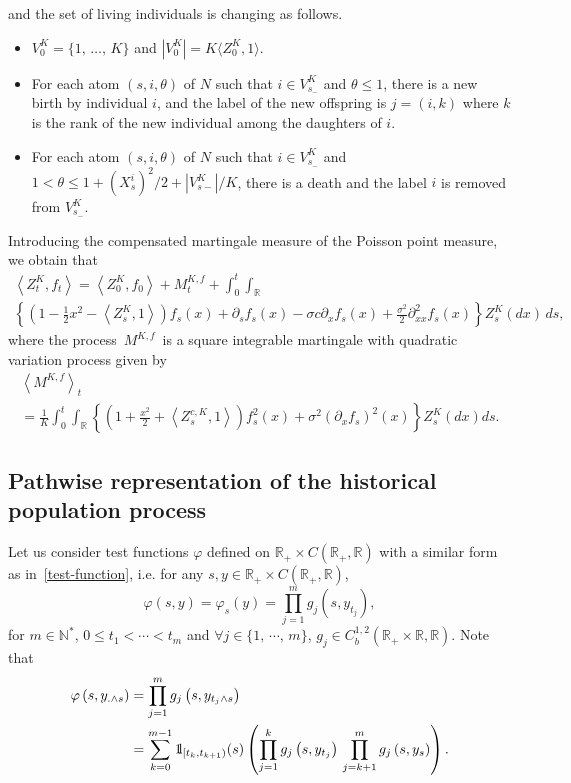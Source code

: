 \documentclass[10pt]{amsart}
\theoremstyle{definition}\newtheorem{defi}[theo]{Definition}\newtheorem{rema}[theo]{Remark}\newtheorem{exam}[theo]{Example}\newtheorem{exem}[theo]{Example}\newtheorem{nota}[theo]{Notation}
\newcommand*\N{\mathbb{N}}
\newcommand*\R{\mathbb{R}}
\newcommand*\ind{{\mathchoice {\rm 1\mskip-4mu l} {\rm 1\mskip-4mu l} {\rm 1\mskip-4.5mu l} {\rm 1\mskip-5mu l}}}
\let\oldforall\forall
\renewcommand*{\forall}{\mathrel{\oldforall}}
\begin{document}
and the set of living individuals is changing as follows.
\begin{itemize}
\item $V^K_0=\{1,\,\ldots,\,K\}$ and $|V^K_0|=K\langle Z^K_0,1\rangle$.
\item For each atom $(s,i,\theta)$ of $N$ such that $i\in V^K_{s_-}$ and $\theta\leq 1$, there is a new birth by individual $i$, and the label of the new offspring is $j=(i,k)$ where $k$ is the rank of the new individual among the daughters of $i$.
\item For each atom $(s,i,\theta)$ of $N$ such that $i\in V^K_{s_-}$ and $1<\theta\leq 1+(X^i_s)^2/2+|V^K_{s-}|/K$, there is a death and the label $i$ is removed from $V^K_{s_-}$.
\end{itemize}

Introducing the compensated martingale measure of the Poisson point measure, we obtain that
\begin{multline}\label{ZK}
\left\langle Z^{K}_{t},f_t\right\rangle=\left\langle Z^{K}_0,f_0\right\rangle +M^{K, f}_{t} +\int_{0}^{t} \int_{\R}\\
\left\{ \left(1-\frac{1}{2}x^2-\left\langle Z^{K}_{s}, 1\right\rangle\right)f_s(x)
+\partial_sf_s(x)-\sigma c \partial_xf_s(x)+\frac{\sigma^2}{2}\partial^2_{xx}f_s(x)\right\} Z^{K}_{s}(dx)\, ds, 
\end{multline}
where the process $\,M^{K, f}\,$ is a square integrable martingale with quadratic variation process given by
\begin{multline}\label{crochet}
\left\langle M^{K, f} \right\rangle_{t}\\
= \frac{1}{K} \int_{0}^t \int_{\R} \left\{ \left(1+\frac{x^2}{2} + \left\langle Z^{c, K}_{s}, 1\right\rangle\right)f_s^2(x) + {\sigma^2} \left(\partial_x f_s\right)^2(x) \right\} Z^{K}_{s}(dx) ds.
\end{multline}


\subsection{Pathwise representation of the historical population process}\label{app:sde-hist}
Let us consider test functions $\varphi$ defined on $\R_{+}\times C(\R_+,\R)$ with a similar form as in~\eqref{test-function}, i.e. for any $s,y\in \R_{+}\times C(\R_+,\R)$,
\[
\varphi(s,y)=\varphi_s(y) = \prod_{j=1}^m g_{j}\left(s, y_{t_{j}}\right),
\]
for $m\in \N^*$, $0\le t_{1}<\cdots <t_{m}$ and $\forall j \in \{1,\,\cdots,\,m\}$, $g_{j}\in C_{b}^{1,2}(\R_{+}\times\R, \R)$. Note that
\begin{align*}
\varphi\left(s,y_{.\wedge s}\right) &=\prod_{j=1}^m g_{j}\left(s, y_{t_{j}\wedge s}\right) \\
&= \sum_{k=0}^{m-1}\ind_{\left[t_k,t_{k+1}\right)}(s)\left(\prod_{j=1}^k g_j\left(s, y_{t_j}\right) \, \prod_{j=k+1}^m g_j\left(s, y_s\right)\right).
\end{align*}
\end{document}
